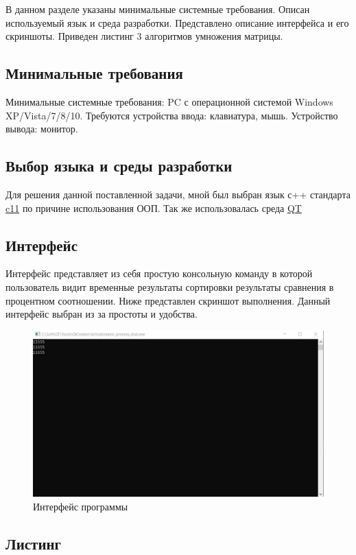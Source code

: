 В данном разделе указаны минимальные системные требования. Описан используемый язык и среда разработки.
Представлено описание интерфейса и его скриншоты. Приведен листинг 3 алгоритмов умножения матрицы.
	
\subsection{Минимальные требования}
	
	Минимальные системные требования: PC с операционной системой Windows XP/Vista/7/8/10. Требуются устройства ввода: клавиатура, мышь. Устройство вывода: монитор.
	
\subsection{Выбор языка и среды разработки}
	
	Для решения данной поставленной задачи, мной был выбран язык с++ стандарта \href{http://www.open-std.org/jtc1/sc22/wg14/www/docs/n1548.pdf}{c11} по причине использования ООП. Так же использовалась среда \href{https://www.qt.io/download}{QT}
	
\subsection{Интерфейс}
	
	Интерфейс представляет из себя простую консольную команду в которой пользователь видит временные результаты сортировки результаты сравнения в процентном соотношении. Ниже представлен скриншот выполнения. Данный интерфейс выбран из за простоты и удобства.
	
	\begin{figure}[H]
		\centering
		\includegraphics[width=0.7\linewidth]{../Рисунки/screen}
		\caption{Интерфейс программы}
		\label{fig:screen}
	\end{figure}
	
	
\subsection{Листинг}

